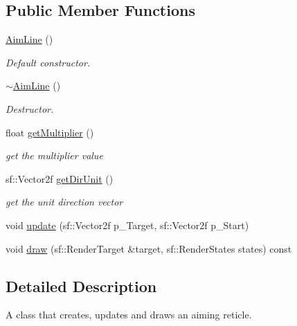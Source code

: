 \subsection*{Public Member Functions}
\begin{DoxyCompactItemize}
\item 
\mbox{\label{class_aim_line_adee034e256147adafb61e5f40ba14f80}} 
\hyperlink{class_aim_line_adee034e256147adafb61e5f40ba14f80}{Aim\+Line} ()
\begin{DoxyCompactList}\small\item\em Default constructor. \end{DoxyCompactList}\item 
\mbox{\label{class_aim_line_ab9c038c34f1ccc00acd2731bf5a05dfc}} 
\hyperlink{class_aim_line_ab9c038c34f1ccc00acd2731bf5a05dfc}{$\sim$\+Aim\+Line} ()
\begin{DoxyCompactList}\small\item\em Destructor. \end{DoxyCompactList}\item 
\mbox{\label{class_aim_line_ab4ef7f120798090a9d14a85f85238edb}} 
float \hyperlink{class_aim_line_ab4ef7f120798090a9d14a85f85238edb}{get\+Multiplier} ()
\begin{DoxyCompactList}\small\item\em get the multiplier value \end{DoxyCompactList}\item 
\mbox{\label{class_aim_line_a03bc44a5faf0b438bbb4c5b9df6927ad}} 
sf\+::\+Vector2f \hyperlink{class_aim_line_a03bc44a5faf0b438bbb4c5b9df6927ad}{get\+Dir\+Unit} ()
\begin{DoxyCompactList}\small\item\em get the unit direction vector \end{DoxyCompactList}\item 
void \hyperlink{class_aim_line_ac84b4e6eba6fadc89229357b33d40187}{update} (sf\+::\+Vector2f p\+\_\+\+Target, sf\+::\+Vector2f p\+\_\+\+Start)
\item 
void \hyperlink{class_aim_line_a119d86ded7801300bde99c30ebda6312}{draw} (sf\+::\+Render\+Target \&target, sf\+::\+Render\+States states) const
\end{DoxyCompactItemize}


\subsection{Detailed Description}
A class that creates, updates and draws an aiming reticle. 

